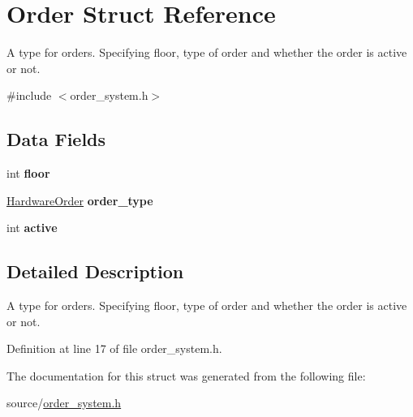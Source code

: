 \hypertarget{structOrder}{}\section{Order Struct Reference}
\label{structOrder}


A type for orders. Specifying floor, type of order and whether the order is active or not.  




{\ttfamily \#include $<$order\+\_\+system.\+h$>$}

\subsection*{Data Fields}
\begin{DoxyCompactItemize}
\item 
\mbox{\label{structOrder_a5243dc659272f25ee0b39a569b9bbd43}} 
int {\bfseries floor}
\item 
\mbox{\label{structOrder_aeddebdba3b07c66358921945e8710825}} 
\hyperlink{hardware_8h_a796a8de8ce0ae769d7dbd3327a7bdbe7}{Hardware\+Order} {\bfseries order\+\_\+type}
\item 
\mbox{\label{structOrder_ae636e03956cfac91b4845f22787770b3}} 
int {\bfseries active}
\end{DoxyCompactItemize}


\subsection{Detailed Description}
A type for orders. Specifying floor, type of order and whether the order is active or not. 

Definition at line 17 of file order\+\_\+system.\+h.



The documentation for this struct was generated from the following file\+:\begin{DoxyCompactItemize}
\item 
source/\hyperlink{order__system_8h}{order\+\_\+system.\+h}\end{DoxyCompactItemize}

